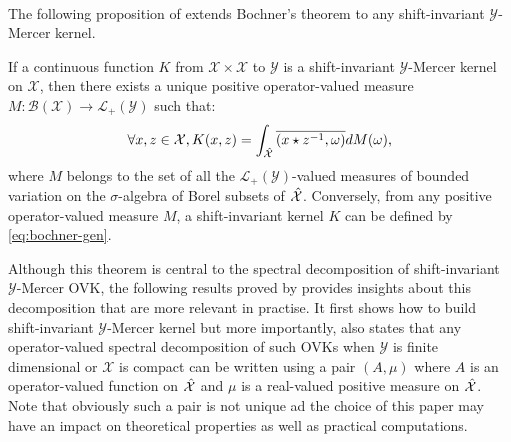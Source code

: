 \paragraph{}
The following proposition of \citet{Zhang2012,Carmeli2010} extends Bochner's theorem to any shift-invariant $\mathcal{Y}$-Mercer kernel. 
\begin{proposition}
If a continuous function $K$ from $\mathcal{X} \times \mathcal{X}$ to $\mathcal{Y}$ is a shift-invariant $\mathcal{Y}$-Mercer kernel on $\mathcal{X}$, then there exists a unique positive operator-valued measure $M: \mathcal{B}(\mathcal{X}) \to \mathcal{L}_+(\mathcal{Y})$ such that:
\begin{equation}\label{eq:bochner-gen}
\forall x, z \in \mathcal{X}, K(x, z) = \int_{\hat{\mathcal{X}}} \overline{(x \star {z}^{-1}, \omega)} dM(\omega),
\end{equation}
where $M$ belongs to the set of all the $\mathcal{L}_+(\mathcal{Y})$-valued measures of bounded variation on the $\sigma$-algebra of Borel subsets of $\hat{\mathcal{X}}$. Conversely, from any positive operator-valued measure $M$, a shift-invariant kernel $K$ can be defined by \cref{eq:bochner-gen}. 
\end{proposition}
Although this theorem is central to the spectral decomposition of shift-invariant $\mathcal{Y}$-Mercer \acs{OVK}, the following results proved by \citet{Carmeli2010} provides insights about this decomposition that are more relevant in practise. It first shows how to build shift-invariant $\mathcal{Y}$-Mercer kernel but more importantly, also states that any operator-valued spectral decomposition of such \acs{OVK}s when $\mathcal{Y}$ is finite dimensional or $\mathcal{X}$ is compact can be written using a pair $(A, \mu)$ where $A$ is an operator-valued function on $\hat{\mathcal{X}}$ and $\mu$ is a real-valued positive measure on $\hat{\mathcal{X}}$. Note that obviously such a pair is not unique ad the choice of this paper may have an impact on theoretical properties as well as practical computations.
